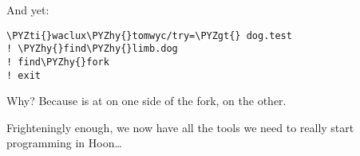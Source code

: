 And yet:

\begin{framed_shaded}
\begin{Verbatim}[fontsize=\relsize{-2.5},fontseries=b,commandchars=\\\{\}]
\PYZti{}waclux\PYZhy{}tomwyc/try=\PYZgt{} dog.test
! \PYZhy{}find\PYZhy{}limb.dog
! find\PYZhy{}fork
! exit
\end{Verbatim}
\end{framed_shaded}

Why?  Because  is at  on one side of the fork,  on
the other.

Frighteningly enough, we now have all the tools we need to really
start programming in Hoon\ldots{}